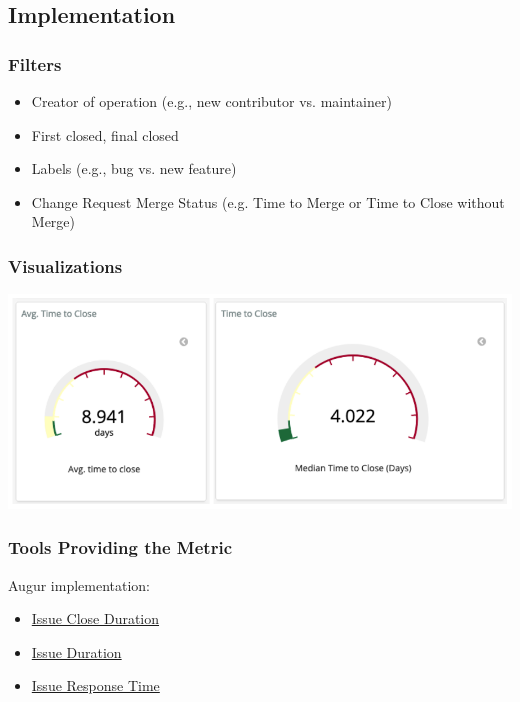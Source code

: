 \hypertarget{implementation}{%
\subsection{Implementation}\label{implementation}}

\hypertarget{filters}{%
\subsubsection{Filters}\label{filters}}

\begin{itemize}
\tightlist
\item
  Creator of operation (e.g., new contributor vs. maintainer)\\
\item
  First closed, final closed\\
\item
  Labels (e.g., bug vs. new feature)
\item
  Change Request Merge Status (e.g. Time to Merge or Time to Close
  without Merge)
\end{itemize}

\hypertarget{visualizations}{%
\subsubsection{Visualizations}\label{visualizations}}

\includegraphics{images/time-to-close_1.png}

\hypertarget{tools-providing-the-metric}{%
\subsubsection{Tools Providing the
Metric}\label{tools-providing-the-metric}}

Augur implementation:

\begin{itemize}
\tightlist
\item
  \href{http://augur.osshealth.io/api_docs/\#api-Evolution-Closed_Issue_Resolution_Duration(Repo)}{Issue
  Close Duration}\\
\item
  \href{http://augur.osshealth.io/api_docs/\#api-Evolution-issue-duration-repo}{Issue
  Duration}\\
\item
  \href{http://augur.osshealth.io/api_docs/\#api-Evolution-Issue_Response_Time(Repo)}{Issue
  Response Time}
\end{itemize}

